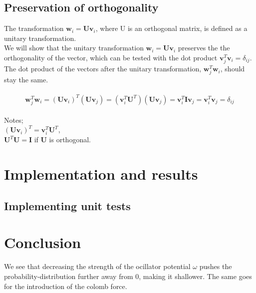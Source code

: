 \documentclass[a4paper]{article}
\begin{document}
\subsection{Preservation of orthogonality}

The transformation $\textbf{w}_i = \textbf{U}\textbf{v}_i$, where U is an orthogonal matrix, is defined as a unitary transformation.
\\
We will show that the unitary transformation $\textbf{w}_i = \textbf{U}\textbf{v}_i$ preserves the the orthogonality of the vector, which can be tested with the dot product $\textbf{v}_j^T\textbf{v}_i = \delta_{ij}$. The dot product of the vectors after the unitary transformation, $\textbf{w}_j^T\textbf{w}_i$, should stay the same.\\
\\
\begin{equation}
\textbf{w}_j^T\textbf{w}_i = (\textbf{U}\textbf{v}_i)^T(\textbf{U}\textbf{v}_j) = (\textbf{v}_i^T\textbf{U}^T)(\textbf{U}\textbf{v}_j) = \textbf{v}_i^T\textbf{I}\textbf{v}_j = \textbf{v}_i^T\textbf{v}_j = \delta_{ij}
\end{equation}
\\
Notes;\\
$(\textbf{U}\textbf{v}_i)^T = \textbf{v}_i^T\textbf{U}^T$,\\
$\textbf{U}^T\textbf{U} = \textbf{I}$ if $\textbf{U}$ is orthogonal.

\section{Implementation and results}\label{sec:implementation_and_results}
\subsection{Implementing unit tests}

\section{Conclusion}\label{sec:conclusion}
We see that decreasing the strength of the ocillator potential $\omega$ pushes the probability-distribution further away from 0, making it shallower. The same goes for the introduction of the colomb force.


%
%

{}
\end{document}
